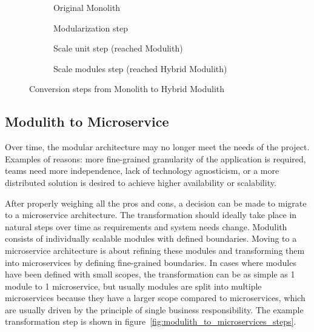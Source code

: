 \begin{figure}
    \centering
    \begin{subfigure}{.5\textwidth}
        \centering
        
        \caption{Original Monolith}
    \end{subfigure}%
    \begin{subfigure}{.5\textwidth}
        \centering
        
        \caption{Modularization step}
    \end{subfigure}
    \begin{subfigure}{\textwidth}
        \centering
        
        \caption{Scale unit step (reached Modulith)}
    \end{subfigure}%
    \hfill
    \begin{subfigure}{\textwidth}
        \centering
        
        \caption{Scale modules step (reached Hybrid Modulith)}
    \end{subfigure}
    \caption{Conversion steps from Monolith to Hybrid Modulith}
    \label{fig:monolith_to_modulith_steps}
\end{figure}


\subsection{Modulith to Microservice}
Over time, the modular architecture may no longer meet the needs of the project. Examples of reasons: more fine-grained granularity of the application is required, teams need more independence, lack of technology agnosticism, or a more distributed solution is desired to achieve higher availability or scalability.

After properly weighing all the pros and cons, a decision can be made to migrate to a microservice architecture. The transformation should ideally take place in natural steps over time as requirements and system needs change. Modulith consists of individually scalable modules with defined boundaries. Moving to a microservice architecture is about refining these modules and transforming them into microservices by defining fine-grained boundaries. In cases where modules have been defined with small scopes, the transformation can be as simple as 1 module to 1 microservice, but usually modules are split into multiple microservices because they have a larger scope compared to microservices, which are usually driven by the principle of single business responsibility. The example transformation step is shown in figure~\ref{fig:modulith_to_microservices_steps}.

